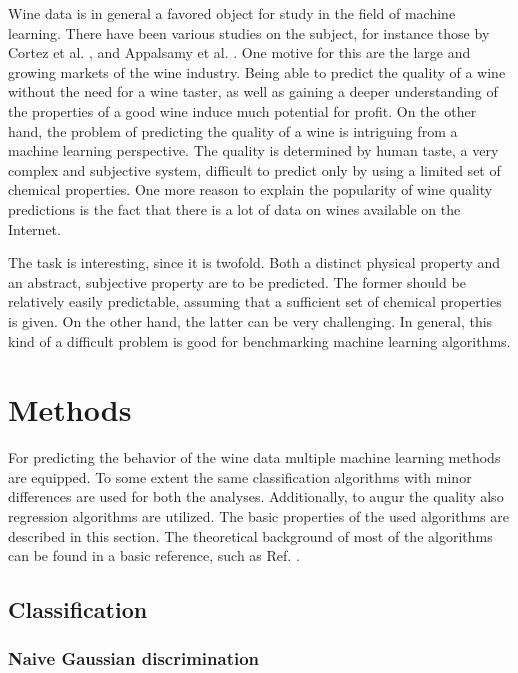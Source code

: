 \documentclass[twoside]{article}
\begin{document}
\begin{multicols}{2}
Wine data is in general a favored object for study in the field of machine learning. There have been various studies
on the subject, for instance those by Cortez et al. \cite{WQA}, \cite{CorCer09} 
and Appalsamy et al. \cite{Appalsami}. One motive for this are the large and growing markets of the wine industry.
Being able to predict the quality of a wine without the need for a wine taster, as well as gaining a deeper understanding
of the properties of a good wine induce much potential for profit. On the other hand, the problem of predicting
the quality of a wine is intriguing from a machine learning perspective. The quality is determined by human taste,
a very complex and subjective system, difficult to predict only by using a limited set of chemical properties.
One more reason to explain the popularity of wine quality predictions is the fact that there is a lot of data
on wines available on the Internet.

The task is interesting, since it is twofold. Both a distinct physical property and an abstract, subjective property
are to be predicted. The former should be relatively easily predictable, assuming that a sufficient set
of chemical properties is given. On the other hand, the latter can be very challenging.
In general, this kind of a difficult problem is good for benchmarking machine learning algorithms.
 
\section{Methods}

For predicting the behavior of the wine data multiple machine learning methods are equipped.
To some extent the same classification algorithms with minor differences are used for both
the analyses. Additionally, to augur the 
quality also regression algorithms are utilized. The basic properties of the used algorithms
are described in this section. The theoretical background of most of the algorithms can be found
in a basic reference, such as Ref. \cite{Alpaydin}. 

\subsection{Classification}

\subsubsection{Naive Gaussian discrimination} \label{method:naiivig}


\end{multicols}
\end{document}
